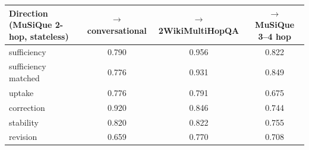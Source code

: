 \begin{tabular}{lccc}
\toprule
Direction (MuSiQue 2-hop, stateless) & $\to$ conversational & $\to$ 2WikiMultiHopQA & $\to$ MuSiQue 3--4 hop \\
\midrule
sufficiency & 0.790 & 0.956 & 0.822 \\
sufficiency matched & 0.776 & 0.931 & 0.849 \\
uptake & 0.776 & 0.791 & 0.675 \\
correction & 0.920 & 0.846 & 0.744 \\
stability & 0.820 & 0.822 & 0.755 \\
revision & 0.659 & 0.770 & 0.708 \\
\bottomrule
\end{tabular}
